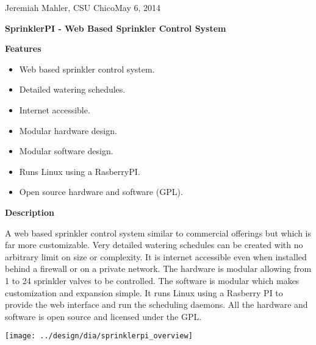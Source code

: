 \documentclass{article}
\begin{document}
\noindent Jeremiah Mahler, CSU Chico\hfill May 6, 2014 \\
\vspace*{0.3in}
\centerline{\Large \textbf{SprinklerPI - Web Based Sprinkler Control System}}
\vspace{0.1in}
\hrulefill

\thispagestyle{empty}

{\large \textbf{Features}}
\begin{itemize}
\item Web based sprinkler control system.
\item Detailed watering schedules.
\item Internet accessible.
\item Modular hardware design.
\item Modular software design.
\item Runs Linux using a RasberryPI.
\item Open source hardware and software (GPL).
\end{itemize}

{\large \textbf{Description}}

A web based sprinkler control system similar to commercial offerings
but which is far more customizable.
Very detailed watering schedules can be created with no arbitrary limit
on size or complexity.
It is internet accessible even when installed behind a firewall or on
a private network.
The hardware is modular allowing from 1 to 24 sprinkler valves to be controlled.
The software is modular which makes customization and expansion simple.
It runs Linux using a Rasberry PI to provide the web interface and
run the scheduling daemons.
All the hardware and software is open source and licensed under the GPL.

\vspace{0.13in}

\begin{center}
\texttt{[image: ../design/dia/sprinklerpi\_overview]}
\end{center}

\hrulefill
\end{document}
